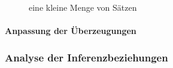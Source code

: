 \documentclass{article}
\begin{document}
\begin{figure}[htbp]
  \centering
  
  \caption{eine kleine Menge von Sätzen\label{fig:classset}}
\end{figure}


\paragraph{Anpassung der Überzeugungen}

\subsubsection{Analyse der Inferenzbeziehungen}



\newpage
%
%
\printbibliography
\end{document}
